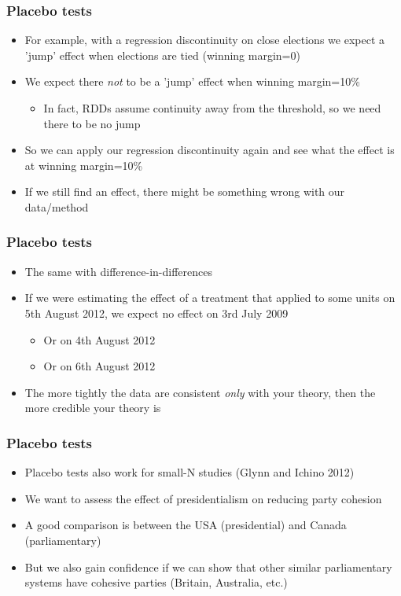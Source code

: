 \documentclass[xcolor=x11names,compress]{beamer}\usepackage[]{graphicx}\usepackage[]{color}
\renewcommand{\(}{\begin{columns}}
\renewcommand{\)}{\end{columns}}
\newcommand{\<}[1]{\begin{column}{#1}}
\renewcommand{\>}{\end{column}}
\begin{document}
\begin{frame}
\frametitle{Placebo tests}
\begin{itemize}
\item For example, with a regression discontinuity on close elections we expect a 'jump' effect when elections are tied (winning margin=0)
\item We expect there \textit{not} to be a 'jump' effect when winning margin=10\%
\begin{itemize}
\item In fact, RDDs assume continuity away from the threshold, so we need there to be no jump
\end{itemize}
\item So we can apply our regression discontinuity again and see what the effect is at winning margin=10\%
\item If we still find an effect, there might be something wrong with our data/method
\end{itemize}
\end{frame}

\begin{frame}
\frametitle{Placebo tests}
\begin{itemize}
\item The same with difference-in-differences
\item If we were estimating the effect of a treatment that applied to some units on 5th August 2012, we expect no effect on 3rd July 2009
\begin{itemize}
\item Or on 4th August 2012
\item Or on 6th August 2012
\end{itemize}
\item The more tightly the data are consistent \textit{only} with your theory, then the more credible your theory is
\end{itemize}
\end{frame}

\begin{frame}
\frametitle{Placebo tests}
\begin{itemize}
\item Placebo tests also work for small-N studies (Glynn and Ichino 2012)
\item We want to assess the effect of presidentialism on reducing party cohesion
\item A good comparison is between the USA (presidential) and Canada (parliamentary)
\item But we also gain confidence if we can show that other similar parliamentary systems have cohesive parties (Britain, Australia, etc.)
\end{itemize}
\end{frame}
\end{document}
